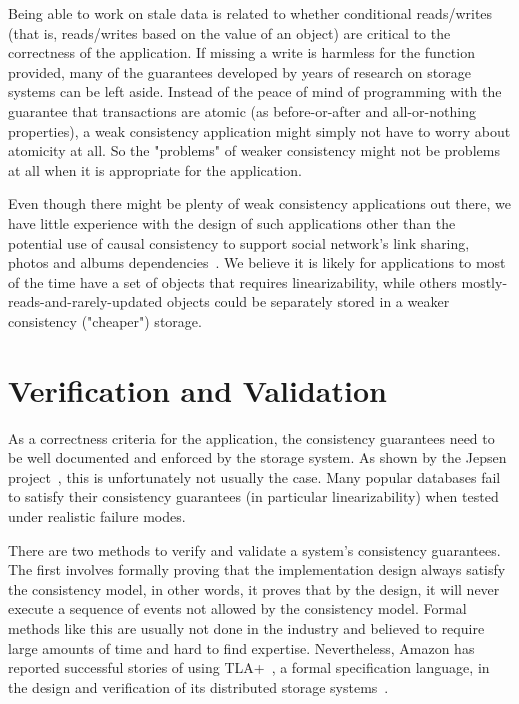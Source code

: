 \documentclass[12pt,conference]{IEEEtran}
\begin{document}
Being able to work on stale data is related to whether conditional reads/writes (that is, reads/writes based on the value of an object) are critical to the correctness of the application. If missing a write is harmless for the function provided, many of the guarantees developed by years of research on storage systems can be left aside. Instead of the peace of mind of programming with the guarantee that transactions are atomic (as before-or-after and all-or-nothing properties), a weak consistency application might simply not have to worry about atomicity at all. So the "problems" of weaker consistency might not be problems at all when it is appropriate for the application.

Even though there might be plenty of weak consistency applications out there, we have little experience with the design of such applications other than the potential use of causal consistency to support social network's link sharing, photos and albums dependencies~\cite{lloyd2011don}. We believe it is likely for applications to most of the time have a set of objects that requires linearizability, while others mostly-reads-and-rarely-updated objects could be separately stored in a weaker consistency ("cheaper") storage.

\section{Verification and Validation}

As a correctness criteria for the application, the consistency guarantees need to be well documented and enforced by the storage system. As shown by the Jepsen project~\cite{jepsenWebsite,jepsenGithubWebsite}, this is unfortunately not usually the case. Many popular databases fail to satisfy their consistency guarantees (in particular linearizability) when tested under realistic failure modes.

There are two methods to verify and validate a system's consistency guarantees. The first involves formally proving that the implementation design always satisfy the consistency model, in other words, it proves that by the design, it will never execute a sequence of events not allowed by the consistency model. Formal methods like this are usually not done in the industry and believed to require large amounts of time and hard to find expertise. Nevertheless, Amazon has reported successful stories of using TLA+~\cite{tlaWebsite}, a formal specification language, in the design and verification of its distributed storage systems~\cite{newcombe2014use}.
\end{document}
